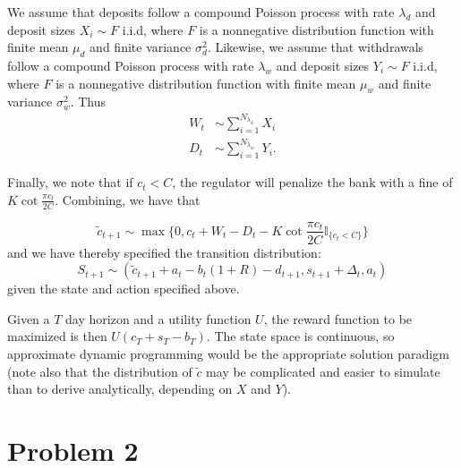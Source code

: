 \documentclass{article}
\begin{document}
We assume that deposits follow a compound Poisson process with rate $\lambda_d$ and deposit sizes $X_i \sim F$ i.i.d, where $F$ is a nonnegative distribution function with finite mean $\mu_d$ and finite variance $\sigma_d^2$. Likewise, we assume that withdrawals follow a compound Poisson process with rate $\lambda_w$ and deposit sizes $Y_i \sim F$ i.i.d, where $F$ is a nonnegative distribution function with finite mean $\mu_w$ and finite variance $\sigma_w^2$. Thus
\begin{align}
    W_t &\sim \sum_{i=1}^{N_{\lambda_d}} X_i\\
    D_t &\sim \sum_{i=1}^{N_{\lambda_w}} Y_i.
\end{align}

Finally, we note that if $c_t < C$, the regulator will penalize the bank with a fine of $K\cot\frac{\pi c_t}{2C}$. Combining, we have that 

\begin{equation}
    \tilde{c}_{t+1} \sim \max\{0, c_t + W_t - D_t - K\cot\frac{\pi c_t}{2C} \mathbb{I}_{\{c_t < C\}}\}
\end{equation}
and we have thereby specified the transition distribution: 
\begin{equation}
    S_{t+1} \sim (\tilde{c}_{t+1} + a_t - b_t(1+R) - d_{t+1}, s_{t+1} + \Delta_t, a_t)
\end{equation}
given the state and action specified above.

Given a $T$ day horizon and a utility function $U$, the reward function to be maximized is then $U(c_T + s_T - b_T)$. The state space is continuous, so approximate dynamic programming would be the appropriate solution paradigm (note also that the distribution of $\tilde{c}$ may be complicated and easier to simulate than to derive analytically, depending on $X$ and $Y$).

\section*{Problem 2}
\end{document}

